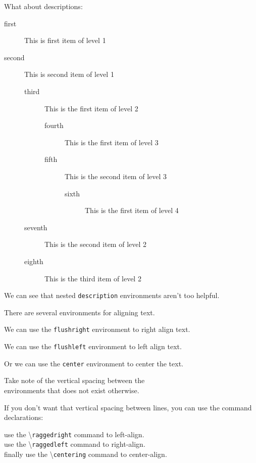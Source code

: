 \documentclass[12pt]{amsart}
\theoremstyle{plain}
\newtheorem{name of environment}{Typeset Proclamation} %
\newtheorem*{no numbering}{No Numbering}
\theoremstyle{definition}
\theoremstyle{remark}
\begin{document}
What about descriptions:
\begin{description}
\item[first] This is first item of level 1
\item[second] This is  second item of level 1
	\begin{description}
	\item[third] This is the first item of level 2
		\begin{description}
		\item[fourth] This is the first item of level 3
		\item[fifth] This is the second item of level 3
			\begin{description}
			\item[sixth] This is the first item of level 4
			\end{description}
		\end{description}
	\item[seventh] This is the second item of level 2
	\item[eighth] This is the third item of level 2
	\end{description}
\end{description}
We can see that nested \texttt{description} environments aren't too helpful.
\vspace{12pt}

There are several environments for aligning text.
\begin{flushright}
We can use the \texttt{flushright} environment to right align text.
\end{flushright}
\begin{flushleft}
We can use the \texttt{flushleft} environment to left align text.
\end{flushleft}
\begin{center}
Or we can use the \texttt{center} environment to center the text.
\end{center}
Take note of the vertical spacing between the \\
environments that does not exist otherwise. \par
If you don't want that vertical spacing between lines, you can use the command declarations: \\
\raggedright use the \textbackslash \texttt{raggedright} command to left-align.\\
\raggedleft use the \textbackslash \texttt{raggedleft} command to right-align.\\
\centering finally use the \textbackslash \texttt{centering} command to center-align. 
\vspace{12pt}
\end{document}
